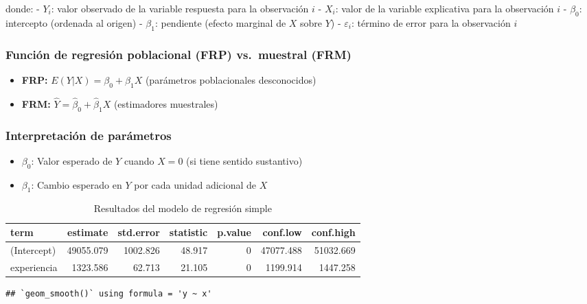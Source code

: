 \documentclass[
  oneside]{book}
\providecommand{\tightlist}{%
  \setlength{\itemsep}{0pt}\setlength{\parskip}{0pt}}
\begin{document}
donde:
- \(Y_i\): valor observado de la variable respuesta para la observación \(i\)
- \(X_i\): valor de la variable explicativa para la observación \(i\)
- \(\beta_0\): intercepto (ordenada al origen)
- \(\beta_1\): pendiente (efecto marginal de \(X\) sobre \(Y\))
- \(\varepsilon_i\): término de error para la observación \(i\)

\subsubsection{Función de regresión poblacional (FRP) vs.~muestral (FRM)}\label{funciuxf3n-de-regresiuxf3n-poblacional-frp-vs.-muestral-frm}

\begin{itemize}
\tightlist
\item
  \textbf{FRP:} \(E(Y|X) = \beta_0 + \beta_1 X\) (parámetros poblacionales desconocidos)
\item
  \textbf{FRM:} \(\hat{Y} = \hat{\beta}_0 + \hat{\beta}_1 X\) (estimadores muestrales)
\end{itemize}

\subsubsection{Interpretación de parámetros}\label{interpretaciuxf3n-de-paruxe1metros}

\begin{itemize}
\tightlist
\item
  \(\beta_0\): Valor esperado de \(Y\) cuando \(X = 0\) (si tiene sentido sustantivo)
\item
  \(\beta_1\): Cambio esperado en \(Y\) por cada unidad adicional de \(X\)
\end{itemize}

\begin{table}
\centering
\caption{\label{tab:regresion-simple}Resultados del modelo de regresión simple}
\centering
\begin{tabular}[t]{l|r|r|r|r|r|r}
\hline
term & estimate & std.error & statistic & p.value & conf.low & conf.high\\
\hline
(Intercept) & 49055.079 & 1002.826 & 48.917 & 0 & 47077.488 & 51032.669\\
\hline
experiencia & 1323.586 & 62.713 & 21.105 & 0 & 1199.914 & 1447.258\\
\hline
\end{tabular}
\end{table}

\begin{verbatim}
## `geom_smooth()` using formula = 'y ~ x'
\end{verbatim}
\end{document}
